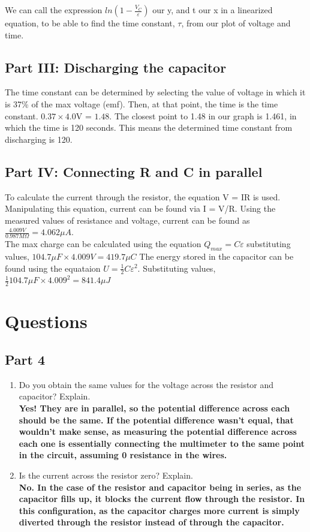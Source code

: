 \documentclass[titlepage]{article}
\begin{document}
    We can call the expression $ln(1-\frac{V_C}{\varepsilon})$ our y, and t our x in a linearized equation, to be able to find the time constant, $\tau$, from our plot of voltage and time.  

	\subsection{Part III: Discharging the capacitor}
	The time constant can be determined by selecting the value of voltage in which it is 37\% of the max voltage (emf). Then, at that point, the time is the time constant. $0.37 \times 4.0$V = $1.48$. The closest point to 1.48 in our graph is 1.461, in which the time is 120 seconds. This means the determined time constant from discharging is 120.
	\subsection{Part IV: Connecting R and C in parallel}
	To calculate the current through the resistor, the equation V = IR is used. Manipulating this equation, current can be found via I = V/R. Using the measured values of resistance and voltage, current can be found as $\frac{4.009V}{0.987M\Omega} = 4.062\mu A$.\\
	The max charge can be calculated using the equation $Q_{max} = C\varepsilon$ substituting values, $104.7\mu F \times 4.009V = 419.7\mu C$
	The energy stored in the capacitor can be found using the equataion $U = \frac{1}{2}C\varepsilon^2$. Substituting values, $\frac{1}{2}104.7\mu F \times 4.009^2 = 841.4\mu J$
	\section{Questions}
    \subsection{Part 4}
    \begin{enumerate}
        \item Do you obtain the same values for the voltage across the resistor and capacitor? Explain.\\ 
            \textbf{Yes! They are in parallel, so the potential difference across each should be the same. If the potential difference wasn’t equal, that wouldn’t make sense, as measuring the potential difference across each one is essentially connecting the multimeter to the same point in the circuit, assuming 0 resistance in the wires.}
        \item Is the current across the resistor zero? Explain.\\ 
            \textbf{No. In the case of the resistor and capacitor being in series, as the capacitor fills up, it blocks the current flow through the resistor. In this configuration, as the capacitor charges more current is simply diverted through the resistor instead of through the capacitor.}



    \end{enumerate}
\end{document}
